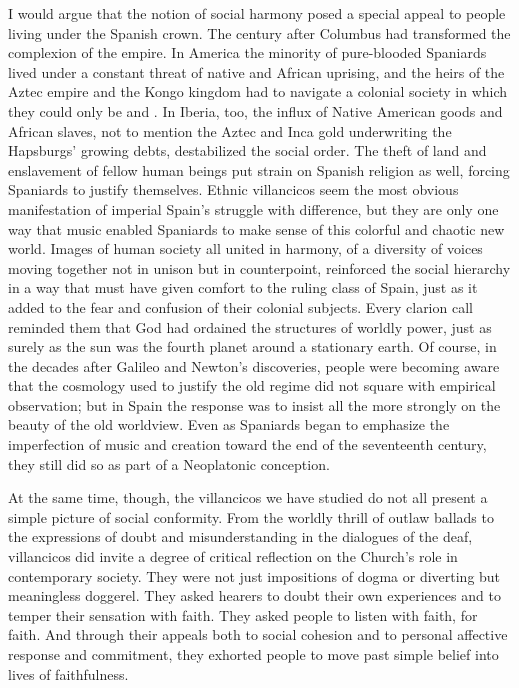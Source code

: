 I would argue that the notion of social harmony posed a special appeal to
people living under the Spanish crown.
The century after Columbus had transformed the complexion of the empire.
In America the minority of pure-blooded Spaniards lived under a constant threat
of native and African uprising, and the heirs of the Aztec empire and the Kongo
kingdom had to navigate a colonial society in which they could only be
 and .
In Iberia, too, the influx of Native American goods and African slaves, not to
mention the Aztec and Inca gold underwriting the Hapsburgs' growing debts,
destabilized the social order.
The theft of land and enslavement of fellow human beings put strain on Spanish
religion as well, forcing Spaniards to justify themselves.
Ethnic villancicos seem the most obvious manifestation of imperial Spain's
struggle with difference, but they are only one way that music enabled
Spaniards to make sense of this colorful and chaotic new world.
Images of human society all united in harmony, of a diversity of voices moving
together not in unison but in counterpoint, reinforced the social hierarchy in
a way that must have given comfort to the ruling class of Spain, just as it
added to the fear and confusion of their colonial subjects.%
    \Autocites
    {Baker:Harmony}
    {Irving:Colonial}
    {Illari:Polychoral}
Every clarion call reminded them that God had ordained the structures of
worldly power, just as surely as the sun was the fourth planet around a
stationary earth.
Of course, in the decades after Galileo and Newton's discoveries, people were
becoming aware that the cosmology used to justify the old regime did not square
with empirical observation; but in Spain the response was to insist all the
more strongly on the beauty of the old worldview.
Even as Spaniards began to emphasize the imperfection of music and creation
toward the end of the seventeenth century, they still did so as part of a 
Neoplatonic conception.

At the same time, though, the villancicos we have studied do not all present a
simple picture of social conformity.
From the worldly thrill of  outlaw ballads to the expressions of
doubt and misunderstanding in the dialogues of the deaf, villancicos did invite
a degree of critical reflection on the Church's role in contemporary society.
They were not just impositions of dogma or diverting but meaningless doggerel.
They asked hearers to doubt their own experiences and to temper their sensation
with faith.
They asked people to listen with faith, for faith.
And through their appeals both to social cohesion and to personal affective
response and commitment, they exhorted people to move past simple belief into
lives of faithfulness.

